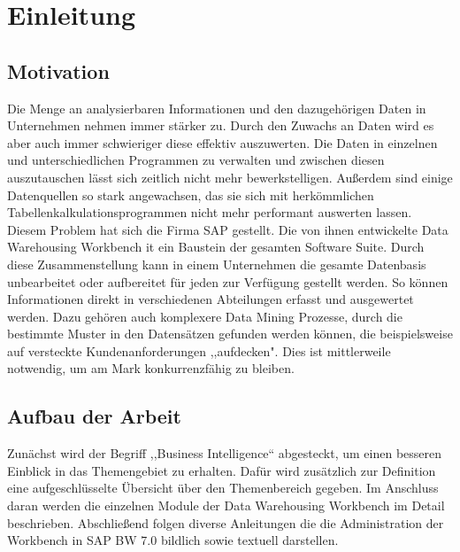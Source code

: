 \chapter{Einleitung}
\label{Kapitel:Einleitung}


\section{Motivation}
 
 Die Menge an analysierbaren  Informationen und den dazugehörigen Daten in Unternehmen nehmen immer stärker zu.  Durch den Zuwachs an Daten wird es aber auch immer schwieriger diese effektiv auszuwerten. Die  Daten in einzelnen und unterschiedlichen Programmen zu verwalten und zwischen diesen auszutauschen lässt sich zeitlich nicht mehr bewerkstelligen. Außerdem sind einige Datenquellen so stark angewachsen, das sie sich mit herkömmlichen Tabellenkalkulationsprogrammen nicht mehr performant auswerten lassen. \\
Diesem Problem hat sich die Firma SAP gestellt. Die von ihnen entwickelte Data Warehousing Workbench it ein Baustein der gesamten Software Suite.  Durch diese Zusammenstellung kann in einem  Unternehmen die gesamte Datenbasis unbearbeitet oder aufbereitet für jeden zur Verfügung gestellt werden. So können Informationen direkt in verschiedenen Abteilungen erfasst und ausgewertet werden. Dazu gehören auch komplexere Data Mining Prozesse, durch die bestimmte Muster in den Datensätzen gefunden werden können, die beispielsweise auf versteckte Kundenanforderungen ,,aufdecken".  Dies ist mittlerweile notwendig, um am Mark konkurrenzfähig zu bleiben. \cite[S. 46 f.]{Herschel:2013kz}
 
\section{ Aufbau der Arbeit}

Zunächst wird der Begriff ,,Business Intelligence`` abgesteckt, um einen besseren Einblick in das Themengebiet zu erhalten. Dafür wird zusätzlich zur Definition  eine aufgeschlüsselte Übersicht über den Themenbereich gegeben. Im Anschluss daran werden die einzelnen Module der Data Warehousing Workbench im Detail beschrieben. Abschließend folgen diverse Anleitungen die die Administration der Workbench in SAP BW 7.0 bildlich sowie textuell darstellen.


 
